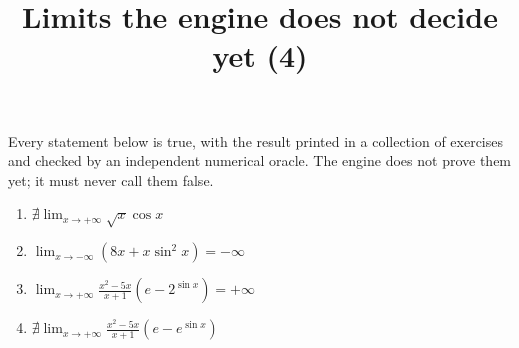 \documentclass[11pt,a4paper]{article}
\title{Limits the engine does not decide yet (4)}
\author{}
\date{}
\begin{document}
\maketitle
Every statement below is true, with the result printed in a collection of exercises and checked by an independent numerical oracle. The engine does not prove them yet; it must never call them false.

\begin{enumerate}
\item $\displaystyle \nexists \lim_{x \to +\infty} \sqrt{x}\cos x$
\item $\displaystyle \lim_{x \to -\infty} (8x + x\sin^{2} x) = -\infty$
\item $\displaystyle \lim_{x \to +\infty} \frac{x^{2} - 5x}{x + 1}\left(e - 2^{\sin x}\right) = +\infty$
\item $\displaystyle \nexists \lim_{x \to +\infty} \frac{x^{2} - 5x}{x + 1}\left(e - e^{\sin x}\right)$
\end{enumerate}
\end{document}
